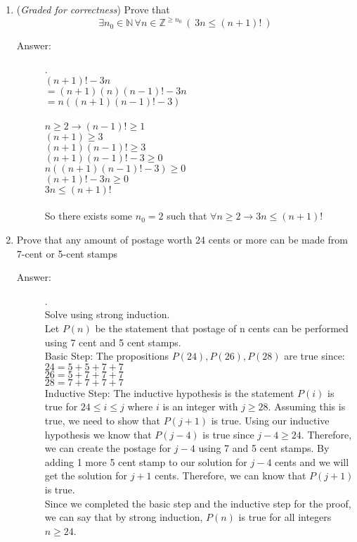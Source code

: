 \documentclass[12pt, oneside]{article}
\begin{document}
\begin{enumerate}
\begin{enumerate}
\end{enumerate}

\item ({\it Graded for correctness}) Prove that $$\exists n_0 \in \mathbb{N} \, \forall n \in \mathbb{Z}^{\geq n_0} \, (~3n \leq (n+1)!~)$$
\begin{description}
    \item[Answer:] .\\
        $(n+1)!-3n$\\
        $=(n+1)(n)(n-1)!-3n$\\
        $=n((n+1)(n-1)!-3)$\\\\
        $n \geq 2 \rightarrow (n-1)! \geq 1$\\
        $(n+1) \geq 3$\\
        $(n+1)(n-1)! \geq 3$\\
        $(n+1)(n-1)!-3 \geq 0$\\
        $n((n+1)(n-1)! -3) \geq 0$\\
        $(n+1)! -3n \geq 0$\\
        $3n \leq (n+1)!$\\\\
        So there exists some $n_0=2$ such that $\forall n \geq 2 \rightarrow 3n \leq (n+1)!$
\end{description}
\item Prove that any amount of postage worth 24 cents or more can be made from 7-cent or 5-cent stamps
\begin{description}
    \item[Answer:] .\\
        Solve using strong induction.\\
        Let $P(n)$ be the statement that postage of n cents can be performed using 7 cent and 5 cent stamps.\\
        Basic Step: The propositions $P(24), P(26), P(28)$ are true since:\\
        $24 = 5+5+7+7$\\
        $26 = 5+7+7+7$\\
        $28 = 7+7+7+7$\\
        Inductive Step: The inductive hypothesis is the statement $P(i)$ is true for $24 \leq i \leq j$ where $i$ is an integer with $j \geq 28$. Assuming this is true, we need to show that $P(j+1)$ is true. Using our inductive hypothesis we know that $P(j-4)$ is true since $j-4 \geq 24$. Therefore, we can create the postage for $j-4$ using 7 and 5 cent stamps. By adding 1 more 5 cent stamp to our solution for $j-4$ cents and we will get the solution for $j+1$ cents. Therefore, we can know that $P(j+1)$ is true.\\
        Since we completed the basic step and the inductive step for the proof, we can say that by strong induction, $P(n)$ is true for all integers $n \geq 24$.
\end{description}


\end{enumerate}
\end{document}
